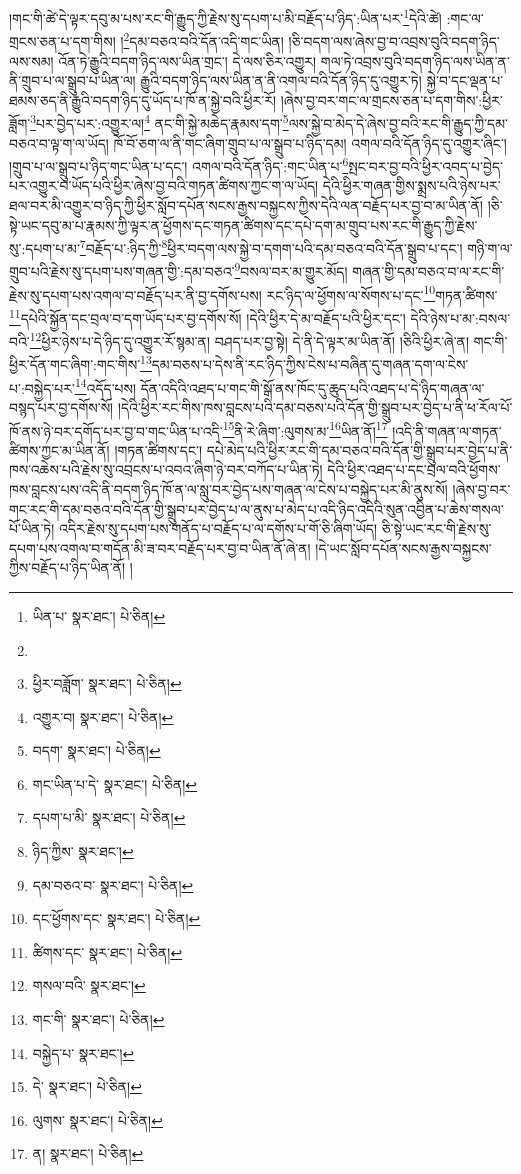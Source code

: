 །གང་གི་ཚེ་དེ་ལྟར་དབུ་མ་པས་རང་གི་རྒྱུད་ཀྱི་རྗེས་སུ་དཔག་པ་མི་བརྗོད་པ་ཉིད་:ཡིན་པར་\footnote{ཡིན་པ་  སྣར་ཐང་།  པེ་ཅིན། }དེའི་ཚེ། :གང་ལ་གྲངས་ཅན་པ་དག་གིས། །\footnote{}དམ་བཅའ་བའི་དོན་འདི་གང་ཡིན། །ཅི་བདག་ལས་ཞེས་བྱ་བ་འབྲས་བུའི་བདག་ཉིད་ལས་སམ། འོན་ཏེ་རྒྱུའི་བདག་ཉིད་ལས་ཡིན་གྲང་། དེ་ལས་ཅིར་འགྱུར། གལ་ཏེ་འབྲས་བུའི་བདག་ཉིད་ལས་ཡིན་ན་ནི་གྲུབ་པ་ལ་སྒྲུབ་པ་ཡིན་ལ། རྒྱུའི་བདག་ཉིད་ལས་ཡིན་ན་ནི་འགལ་བའི་དོན་ཉིད་དུ་འགྱུར་ཏེ། སྐྱེ་བ་དང་ལྡན་པ་ཐམས་ཅད་ནི་རྒྱུའི་བདག་ཉིད་དུ་ཡོད་པ་ཁོ་ན་སྐྱེ་བའི་ཕྱིར་རོ། །ཞེས་བྱ་བར་གང་ལ་གྲངས་ཅན་པ་དག་གིས་:ཕྱིར་ཟློག་\footnote{ཕྱིར་བཟློག་  སྣར་ཐང་།  པེ་ཅིན། }པར་བྱེད་པར་:འགྱུར་ལ།\footnote{འགྱུར་བ།  སྣར་ཐང་།  པེ་ཅིན། } ནང་གི་སྐྱེ་མཆེད་རྣམས་དག་\footnote{བདག་  སྣར་ཐང་།  པེ་ཅིན། }ལས་སྐྱེ་བ་མེད་དེ་ཞེས་བྱ་བའི་རང་གི་རྒྱུད་ཀྱི་དམ་བཅའ་བ་ལྟ་ག་ལ་ཡོད། ཁོ་བོ་ཅག་ལ་ནི་གང་ཞིག་གྲུབ་པ་ལ་སྒྲུབ་པ་ཉིད་དམ། འགལ་བའི་དོན་ཉིད་དུ་འགྱུར་ཞིང་། །གྲུབ་པ་ལ་སྒྲུབ་པ་ཉིད་གང་ཡིན་པ་དང་། འགལ་བའི་དོན་ཉིད་:གང་ཡིན་པ་\footnote{གང་ཡིན་པ་དེ་  སྣར་ཐང་།  པེ་ཅིན། }སྤང་བར་བྱ་བའི་ཕྱིར་འབད་པ་བྱེད་པར་འགྱུར་བ་ཡོད་པའི་ཕྱིར་ཞེས་བྱ་བའི་གཏན་ཚིགས་ཀྱང་ག་ལ་ཡོད། དེའི་ཕྱིར་གཞན་གྱིས་སྨྲས་པའི་ཉེས་པར་ཐལ་བར་མི་འགྱུར་བ་ཉིད་ཀྱི་ཕྱིར་སློབ་དཔོན་སངས་རྒྱས་བསྐྱངས་ཀྱིས་དེའི་ལན་བརྗོད་པར་བྱ་བ་མ་ཡིན་ནོ། །ཅི་སྟེ་ཡང་དབུ་མ་པ་རྣམས་ཀྱི་ལྟར་ན་ཕྱོགས་དང་གཏན་ཚིགས་དང་དཔེ་དག་མ་གྲུབ་པས་རང་གི་རྒྱུད་ཀྱི་རྗེས་སུ་:དཔག་པ་མ་\footnote{དཔག་པ་མི་  སྣར་ཐང་།  པེ་ཅིན། }བརྗོད་པ་:ཉིད་ཀྱི་\footnote{ཉིད་ཀྱིས་  སྣར་ཐང་། }ཕྱིར་བདག་ལས་སྐྱེ་བ་དགག་པའི་དམ་བཅའ་བའི་དོན་སྒྲུབ་པ་དང་། གཉི་ག་ལ་གྲུབ་པའི་རྗེས་སུ་དཔག་པས་གཞན་གྱི་:དམ་བཅའ་\footnote{དམ་བཅའ་བ་  སྣར་ཐང་།  པེ་ཅིན། }བསལ་བར་མ་གྱུར་མོད། གཞན་གྱི་དམ་བཅའ་བ་ལ་རང་གི་རྗེས་སུ་དཔག་པས་འགལ་བ་བརྗོད་པར་ནི་བྱ་དགོས་པས། རང་ཉིད་ལ་ཕྱོགས་ལ་སོགས་པ་དང་\footnote{དང་ཕྱོགས་དང་  སྣར་ཐང་།  པེ་ཅིན། }གཏན་ཚིགས་\footnote{ཚིགས་དང་  སྣར་ཐང་།  པེ་ཅིན། }དཔེའི་སྐྱོན་དང་བྲལ་བ་དག་ཡོད་པར་བྱ་དགོས་སོ། །དེའི་ཕྱིར་དེ་མ་བརྗོད་པའི་ཕྱིར་དང་། དེའི་ཉེས་པ་མ་:བསལ་བའི་\footnote{གསལ་བའི་  སྣར་ཐང་། }ཕྱིར་ཉེས་པ་དེ་ཉིད་དུ་འགྱུར་རོ་སྙམ་ན། བཤད་པར་བྱ་སྟེ། དེ་ནི་དེ་ལྟར་མ་ཡིན་ནོ། །ཅིའི་ཕྱིར་ཞེ་ན། གང་གི་ཕྱིར་དོན་གང་ཞིག་:གང་གིས་\footnote{གང་གི་  སྣར་ཐང་།  པེ་ཅིན། }དམ་བཅས་པ་དེས་ནི་རང་ཉིད་ཀྱིས་ངེས་པ་བཞིན་དུ་གཞན་དག་ལ་ངེས་པ་:བསྐྱེད་པར་\footnote{བསྐྱེད་པ་  སྣར་ཐང་། }འདོད་པས། དོན་འདིའི་འཐད་པ་གང་གི་སྒོ་ནས་ཁོང་དུ་ཆུད་པའི་འཐད་པ་དེ་ཉིད་གཞན་ལ་བསྙད་པར་བྱ་དགོས་སོ། །དེའི་ཕྱིར་རང་གིས་ཁས་བླངས་པའི་དམ་བཅས་པའི་དོན་གྱི་སྒྲུབ་པར་བྱེད་པ་ནི་ཕ་རོལ་པོ་ཁོ་ནས་ཉེ་བར་དགོད་པར་བྱ་བ་གང་ཡིན་པ་འདི་\footnote{དེ་  སྣར་ཐང་།  པེ་ཅིན། }ནི་རེ་ཞིག་:ལུགས་མ་\footnote{ལུགས་  སྣར་ཐང་།  པེ་ཅིན། }ཡིན་ནོ།\footnote{ན།  སྣར་ཐང་།  པེ་ཅིན། } །འདི་ནི་གཞན་ལ་གཏན་ཚིགས་ཀྱང་མ་ཡིན་ནོ། །གཏན་ཚིགས་དང་། དཔེ་མེད་པའི་ཕྱིར་རང་གི་དམ་བཅའ་བའི་དོན་གྱི་སྒྲུབ་པར་བྱེད་པ་ནི་ཁས་འཆེས་པའི་རྗེས་སུ་འབྲངས་པ་འབའ་ཞིག་ཉེ་བར་བཀོད་པ་ཡིན་ཏེ། དེའི་ཕྱིར་འཐད་པ་དང་བྲལ་བའི་ཕྱོགས་ཁས་བླངས་པས་འདི་ནི་བདག་ཉིད་ཁོ་ན་ལ་སླུ་བར་བྱེད་པས་གཞན་ལ་ངེས་པ་བསྐྱེད་པར་མི་ནུས་སོ། །ཞེས་བྱ་བར་གང་རང་གི་དམ་བཅའ་བའི་དོན་གྱི་སྒྲུབ་པར་བྱེད་པ་ལ་ནུས་པ་མེད་པ་འདི་ཉིད་འདིའི་སུན་འབྱིན་པ་ཆེས་གསལ་པོ་ཡིན་ཏེ། འདིར་རྗེས་སུ་དཔག་པས་གནོད་པ་བརྗོད་པ་ལ་དགོས་པ་གོ་ཅི་ཞིག་ཡོད། ཅི་སྟེ་ཡང་རང་གི་རྗེས་སུ་དཔག་པས་འགལ་བ་གདོན་མི་ཟ་བར་བརྗོད་པར་བྱ་བ་ཡིན་ནོ་ཞེ་ན། །དེ་ཡང་སློབ་དཔོན་སངས་རྒྱས་བསྐྱངས་ཀྱིས་བརྗོད་པ་ཉིད་ཡིན་ནོ། །

